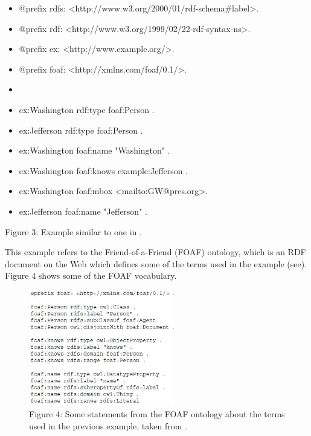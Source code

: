 \documentclass[10pt,journal,compsoc]{IEEEtran}
\begin{document}
\vspace{3mm}
\newpage
\begin{itemize}
\item[]@prefix rdfs:  \textless http://www.w3.org/2000/01/rdf-schema\#label\textgreater .
\item[]@prefix rdf:  \textless http://www.w3.org/1999/02/22-rdf-syntax-ns\textgreater .
  \item[]@prefix ex:  \textless http://www.example.org/\textgreater .
  \item[]@prefix foaf:  \textless http://xmlns.com/foaf/0.1/\textgreater .
  \item[] 
  \item[] ex:Washington rdf:type foaf:Person .
 \item[] ex:Jefferson rdf:type foaf:Person .
 \item[] ex:Washington foaf:name "Washington" .
 \item[] ex:Washington foaf:knows example:Jefferson .
 \item[] ex:Washington foaf:mbox \textless mailto:GW@pres.org\textgreater .
 \item[] ex:Jefferson foaf:name "Jefferson" .
\end{itemize}
\begin{center}{Figure 3: Example similar to one in \cite{_social_2007}.}\end{center}
\vspace{3mm}
This example refers to the Friend-of-a-Friend (FOAF) ontology, which is an RDF document on the Web which defines some of the terms used in the example (see\cite{foaf}).  Figure 4 shows some of the FOAF vocabulary.


\begin{figure}[htbp] %
   \centering
   \includegraphics[width=2.5in]{StmtsFromFOAF.jpg} 
  \caption*{Figure 4: Some statements from the FOAF ontology about the terms used in the previous example, taken from \cite{_social_2007}.}
   \label{}
\label{}   
\end{figure}
\end{document}
